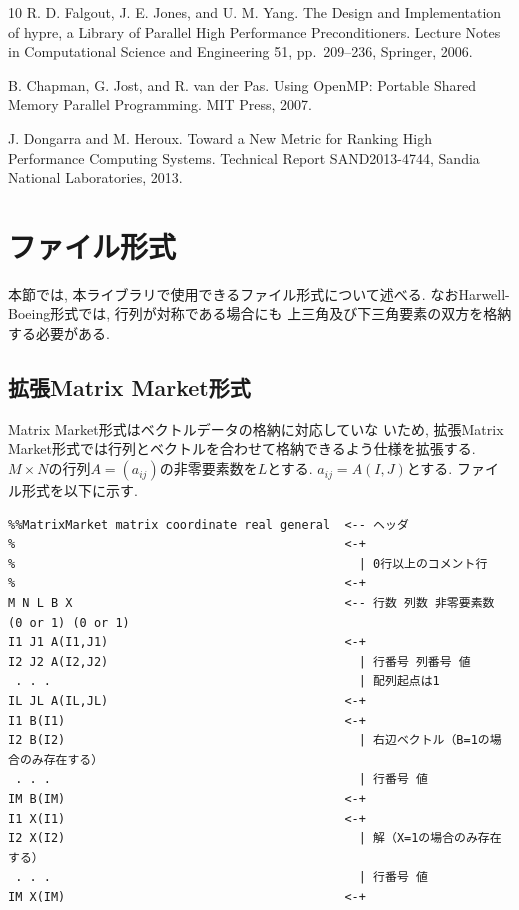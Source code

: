 \documentclass[a4paper]{jarticle}
\begin{document}
{{\begin{thebibliography}{10}
R. D. Falgout, J. E. Jones, and U. M. Yang.
\newblock The Design and Implementation of hypre, a Library of Parallel
	High Performance Preconditioners.
\newblock Lecture Notes in Computational Science and Engineering 51, pp.\ 209--236, Springer, 2006.

B. Chapman, G. Jost, and R. van der Pas.
\newblock Using OpenMP: Portable Shared Memory Parallel Programming.
\newblock MIT Press, 2007.

J. Dongarra and M. Heroux.
\newblock Toward a New Metric for Ranking High Performance Computing Systems.
\newblock Technical Report SAND2013-4744, Sandia National Laboratories, 2013.

\end{thebibliography}

\newpage
\appendix
\section{ファイル形式}
\label{sec:matinp}
本節では, 本ライブラリで使用できるファイル形式について述べる.
なおHarwell-Boeing形式では, 行列が対称である場合にも
上三角及び下三角要素の双方を格納する必要がある. 

\subsection{拡張Matrix Market形式}
Matrix Market形式はベクトルデータの格納に対応していな
いため, 拡張Matrix Market形式では行列とベクトルを合わせて格納できるよう仕様を拡張する. 
$M \times N$の行列$A=(a_{ij})$の非零要素数を$L$とする. 
$a_{ij} = A(I,J)$とする. ファイル形式を以下に示す.

{\small
\begin{verbatim}
%%MatrixMarket matrix coordinate real general  <-- ヘッダ
%                                              <-+ 
%                                                | 0行以上のコメント行
%                                              <-+
M N L B X                                      <-- 行数 列数 非零要素数 (0 or 1) (0 or 1)
I1 J1 A(I1,J1)                                 <-+
I2 J2 A(I2,J2)                                   | 行番号 列番号 値
 . . .                                           | 配列起点は1
IL JL A(IL,JL)                                 <-+
I1 B(I1)                                       <-+
I2 B(I2)                                         | 右辺ベクトル（B=1の場合のみ存在する）
 . . .                                           | 行番号 値
IM B(IM)                                       <-+
I1 X(I1)                                       <-+
I2 X(I2)                                         | 解（X=1の場合のみ存在する）
 . . .                                           | 行番号 値
IM X(IM)                                       <-+
\end{verbatim}
}

}}
\end{document}
